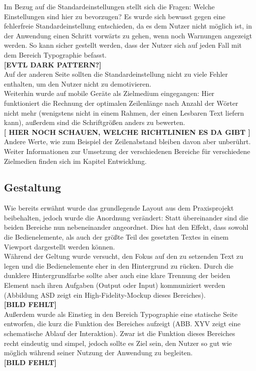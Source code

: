 Im Bezug auf die Standardeinstellungen stellt sich die Fragen: Welche Einstellungen sind hier zu bevorzugen? Es wurde sich bewusst gegen eine fehlerfreie Standardeinstellung entschieden, da es dem Nutzer nicht möglich ist, in der Anwendung einen Schritt vorwärts zu gehen, wenn noch Warnungen angezeigt werden. So kann sicher gestellt werden, dass der Nutzer sich auf jeden Fall mit dem Bereich Typographie befasst.\\
\textbf{[EVTL DARK PATTERN?]}\\
Auf der anderen Seite sollten die Standardeinstellung nicht zu viele Fehler enthalten, um den Nutzer nicht zu demotivieren.\\

Weiterhin wurde auf mobile Geräte als Zielmedium eingegangen: Hier funktioniert die Rechnung der optimalen Zeilenlänge nach Anzahl der Wörter nicht mehr (wenigstens nicht in einem Rahmen, der einen Lesbaren Text liefern kann), außerdem sind die Schriftgrößen anders zu bewerten.\\
\textbf{[ HIER NOCH SCHAUEN, WELCHE RICHTLINIEN ES DA GIBT ]}\\
Andere Werte, wie zum Beispiel der Zeilenabstand bleiben davon aber unberührt. Weiter Informationen zur Umsetzung der verschiedenen Bereiche für verschiedene Zielmedien finden sich im Kapitel Entwicklung.

\subsection{Gestaltung}
Wie bereits erwähnt wurde das grundlegende Layout aus dem Praxisprojekt beibehalten, jedoch wurde die Anordnung verändert: Statt übereinander sind die beiden Bereiche nun nebeneinander angeordnet. Dies hat den Effekt, dass sowohl die Bedienelemente, als auch der größte Teil des gesetzten Textes in einem Viewport dargestellt werden können.\\
Während der Geltung wurde versucht, den Fokus auf den zu setzenden Text zu legen und die Bedienelemente eher in den Hintergrund zu rücken. Durch die dunklere Hintergrundfarbe sollte aber auch eine klare Trennung der beiden Element nach ihren Aufgaben (Output oder Input) kommuniziert werden (Abbildung ASD zeigt ein High-Fidelity-Mockup dieses Bereiches).\\
\textbf{[BILD FEHLT]}\\
Außerdem wurde als Einstieg in den Bereich Typographie eine statische Seite entworfen, die kurz die Funktion des Bereiches aufzeigt (ABB. XYV zeigt eine schematische Ablauf der Interaktion). Zwar ist die Funktion dieses Bereiches recht eindeutig und simpel,  jedoch sollte es Ziel sein, den Nutzer so gut wie möglich während seiner Nutzung der Anwendung zu begleiten.\\
\textbf{[BILD FEHLT]}


